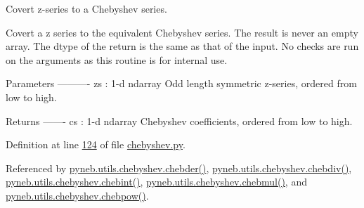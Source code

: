 \begin{DoxyVerb}Covert z-series to a Chebyshev series.

Covert a z series to the equivalent Chebyshev series. The result is
never an empty array. The dtype of the return is the same as that of
the input. No checks are run on the arguments as this routine is for
internal use.

Parameters
----------
zs : 1-d ndarray
    Odd length symmetric z-series, ordered from  low to high.

Returns
-------
cs : 1-d ndarray
    Chebyshev coefficients, ordered from  low to high.\end{DoxyVerb}
 

Definition at line \hyperlink{chebyshev_8py_source_l00124}{124} of file \hyperlink{chebyshev_8py_source}{chebyshev.\-py}.



Referenced by \hyperlink{chebyshev_8py_source_l00841}{pyneb.\-utils.\-chebyshev.\-chebder()}, \hyperlink{chebyshev_8py_source_l00725}{pyneb.\-utils.\-chebyshev.\-chebdiv()}, \hyperlink{chebyshev_8py_source_l00912}{pyneb.\-utils.\-chebyshev.\-chebint()}, \hyperlink{chebyshev_8py_source_l00676}{pyneb.\-utils.\-chebyshev.\-chebmul()}, and \hyperlink{chebyshev_8py_source_l00790}{pyneb.\-utils.\-chebyshev.\-chebpow()}.


